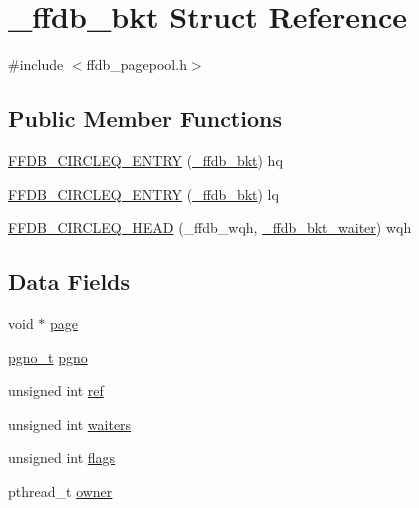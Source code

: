 \hypertarget{struct__ffdb__bkt}{}\section{\+\_\+ffdb\+\_\+bkt Struct Reference}
\label{struct__ffdb__bkt}


{\ttfamily \#include $<$ffdb\+\_\+pagepool.\+h$>$}

\subsection*{Public Member Functions}
\begin{DoxyCompactItemize}
\item 
\mbox{\hyperlink{struct__ffdb__bkt_a0ca6bc2cc68e6384b4b475c41a07fcea}{F\+F\+D\+B\+\_\+\+C\+I\+R\+C\+L\+E\+Q\+\_\+\+E\+N\+T\+RY}} (\mbox{\hyperlink{struct__ffdb__bkt}{\+\_\+ffdb\+\_\+bkt}}) hq
\item 
\mbox{\hyperlink{struct__ffdb__bkt_ac7e62eb857dfeaaf80b72492d3be3584}{F\+F\+D\+B\+\_\+\+C\+I\+R\+C\+L\+E\+Q\+\_\+\+E\+N\+T\+RY}} (\mbox{\hyperlink{struct__ffdb__bkt}{\+\_\+ffdb\+\_\+bkt}}) lq
\item 
\mbox{\hyperlink{struct__ffdb__bkt_af1ee791a45e4526e55dc86d09fb29769}{F\+F\+D\+B\+\_\+\+C\+I\+R\+C\+L\+E\+Q\+\_\+\+H\+E\+AD}} (\+\_\+ffdb\+\_\+wqh, \mbox{\hyperlink{struct__ffdb__bkt__waiter}{\+\_\+ffdb\+\_\+bkt\+\_\+waiter}}) wqh
\end{DoxyCompactItemize}
\subsection*{Data Fields}
\begin{DoxyCompactItemize}
\item 
void $\ast$ \mbox{\hyperlink{struct__ffdb__bkt_ad2fdc4f4409d93c8c67e8842c50d2077}{page}}
\item 
\mbox{\hyperlink{other__libs_2filedb_2filehash_2ffdb__db_8h_a000813331643d38481142bcce7de1501}{pgno\+\_\+t}} \mbox{\hyperlink{struct__ffdb__bkt_ab5accdaea39ef0c2afcbd420f46ff170}{pgno}}
\item 
unsigned int \mbox{\hyperlink{struct__ffdb__bkt_ae27dcd0825bacac9b31bdba869b70cac}{ref}}
\item 
unsigned int \mbox{\hyperlink{struct__ffdb__bkt_a3bfeeda182190ed60dbf8f46dcf64630}{waiters}}
\item 
unsigned int \mbox{\hyperlink{struct__ffdb__bkt_ab5210b13b17bfddd60495e09cce20e31}{flags}}
\item 
pthread\+\_\+t \mbox{\hyperlink{struct__ffdb__bkt_a7c745c3cbd09f67b3e5eef745ab4951f}{owner}}
\end{DoxyCompactItemize}


